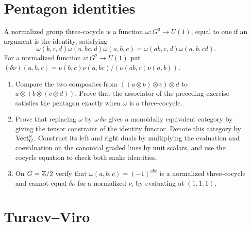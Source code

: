 \section{Pentagon identities}

\begin{exercise}
A normalized group three-cocycle is a function $\omega:G^3\to U(1)$,
equal to one if an argument is the identity, satisfying
\[
 \omega(b,c,d)\omega(a,bc,d)\omega(a,b,c)
 =\omega(ab,c,d)\omega(a,b,cd).
\]
For a normalized function $\nu:G^2\to U(1)$ put
$ (\delta\nu)(a,b,c)=
\nu(b,c)\nu(a,bc)/(\nu(ab,c)\nu(a,b))$.
\begin{enumerate}[label=(\alph*)]
\item Compare the two composites from
$((a\otimes b)\otimes c)\otimes d$ to
$a\otimes(b\otimes(c\otimes d))$.
Prove that the associator of the preceding exercise satisfies
the pentagon exactly when $\omega$ is a three-cocycle.
\item Prove that replacing $\omega$ by $\omega\,\delta\nu$
gives a monoidally equivalent category by giving the tensor
constraint of the identity functor. Denote this category by
$\operatorname{Vect}_G^\omega$.
Construct its left and right duals by multiplying the
evaluation and coevaluation on the canonical graded lines
by unit scalars, and use the cocycle equation to check
both snake identities.
\item On $G=\mathbb Z/2$ verify that $\omega(a,b,c)=(-1)^{abc}$
is a normalized three-cocycle and cannot equal $\delta\nu$ for
a normalized $\nu$, by evaluating at $(1,1,1)$.
\end{enumerate}
\end{exercise}

\section{Turaev--Viro}

